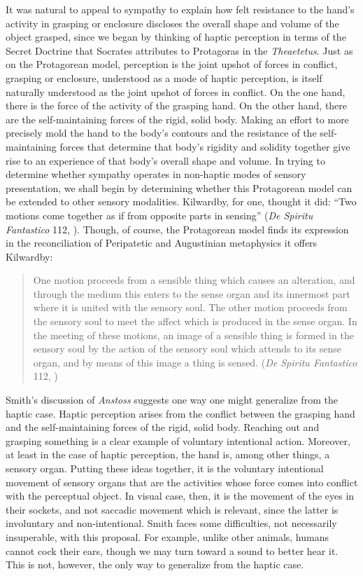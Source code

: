 It was natural to appeal to sympathy to explain how felt resistance to the hand's activity in grasping or enclosure discloses the overall shape and volume of the object grasped, since we began by thinking of haptic perception in terms of the Secret Doctrine that Socrates attributes to Protagoras in the \emph{Theaetetus}. Just as on the Protagorean model, perception is the joint upshot of forces in conflict, grasping or enclosure, understood as a mode of haptic perception, is itself naturally understood as the joint upshot of forces in conflict. On the one hand, there is the force of the activity of the grasping hand. On the other hand, there are the self-maintaining forces of the rigid, solid body. Making an effort to more precisely mold the hand to the body's contours and the resistance of the self-maintaining forces that determine that body's rigidity and solidity together give rise to an experience of that body's overall shape and volume. In trying to determine whether sympathy operates in non-haptic modes of sensory presentation, we shall begin by determining whether this Protagorean model can be extended to other sensory modalities. Kilwardby, for one, thought it did: ``Two motions come together as if from opposite parts in sensing'' (\emph{De Spiritu Fantastico} 112, \citealt[]{Broadie:1993dz}). Though, of course, the Protagorean model finds its expression in the reconciliation of Peripatetic and Augustinian metaphysics it offers Kilwardby:
\begin{quote}
	One motion proceeds from a sensible thing which causes an alteration, and through the medium this enters to the sense organ and its innermost part where it is united with the sensory soul. The other motion proceeds from the sensory soul to meet the affect which is produced in the sense organ. In the meeting of these motions, an image of a sensible thing is formed in the sensory soul by the action of the sensory soul which attends to its sense organ, and by means of this image a thing is sensed. (\emph{De Spiritu Fantastico} 112, \citealt[]{Broadie:1993dz})
\end{quote}

Smith's \citeyearpar{Smith:2002sa} discussion of \emph{Anstoss} suggests one way one might generalize from the haptic case. Haptic perception arises from the conflict between the grasping hand and the self-maintaining forces of the rigid, solid body. Reaching out and grasping something is a clear example of voluntary intentional action. Moreover, at least in the case of haptic perception, the hand is, among other things, a sensory organ. Putting these ideas together, it is the voluntary intentional movement of sensory organs that are the activities whose force comes into conflict with the perceptual object. In visual case, then, it is the movement of the eyes in their sockets, and not saccadic movement which is relevant, since the latter is involuntary and non-intentional. Smith faces some difficulties, not necessarily insuperable, with this proposal. For example, unlike other animals, humans cannot cock their ears, though we may turn toward a sound to better hear it. This is not, however, the only way to generalize from the haptic case. 

